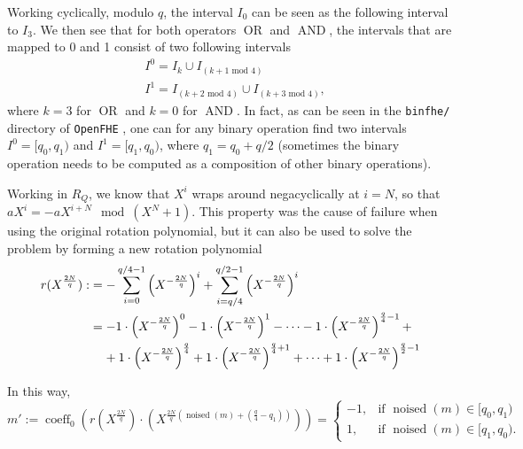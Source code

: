 Working cyclically, modulo $q$, the interval $I_0$ can be seen as the following interval to $I_3$. We then see that for both operators $\operatorname{OR}$ and $\operatorname{AND}$, the intervals that are mapped to 0 and 1 consist of two following intervals
\begin{align*}
&I^0 = I_{k} \cup I_{(k+1 \text{ mod 4})}\\
&I^1 = I_{(k+2 \text{ mod 4})} \cup I_{(k+3 \text{ mod 4})},    
\end{align*}
 where $k=3$ for $\operatorname{OR}$ and $k=0$ for $\operatorname{AND}$. In fact, as can be seen in the \texttt{binfhe/} directory of \texttt{OpenFHE} \cite{cite:openFHE}, one can for any binary operation find two intervals $I^0 = [q_0, q_1)$ and $I^1 = [q_1, q_0)$, where $q_1=q_0 + q/2$ (sometimes the binary operation needs to be computed as a composition of other binary operations).

Working in $R_Q$, we know that $X^i$ wraps around negacyclically at $i=N$, so that $aX^i = -aX^{i+N} \mod (X^N+1)$. This property was the cause of failure when using the original rotation polynomial, but it can also be used to solve the problem by forming a new rotation polynomial
        \begin{align}
            r(X^{\frac{2N}{q}}) :&= -\sum_{i=0}^{q/4-1} \left(X^{-\frac{2N}{q}}\right)^i + \sum_{i=q/4}^{q/2-1} \left(X^{-\frac{2N}{q}}\right)^i \notag \\ %
            &= -1 \cdot \left(X^{-\frac{2N}{q}}\right)^0 - 1 \cdot \left(X^{-\frac{2N}{q}}\right)^1 - \dots - 1 \cdot \left(X^{-\frac{2N}{q}}\right)^{\frac{q}{4}-1} + \notag \\
            & \;\;\;\; + 1 \cdot \left(X^{-\frac{2N}{q}}\right)^{\frac{q}{4}} + 1 \cdot \left(X^{-\frac{2N}{q}}\right)^{\frac{q}{4}+1} + \dots + 1 \cdot \left(X^{-\frac{2N}{q}}\right)^{\frac{q}{2}-1} \notag
        \end{align}

In this way,
\begin{equation*}
    m':=\operatorname{coeff}_0\left(r(X^{\frac{2N}{q}}) \cdot \left(X^{\frac{2N}{q}(\operatorname{noised}(m)+(\frac{q}{4}-q_1))}\right)\right) = 
    \begin{cases}
      -1, & \text{if $\operatorname{noised}(m) \in [q_0, q_1)$} \\
      1, & \text{if $\operatorname{noised}(m) \in [q_1, q_0)$}.
    \end{cases}
\end{equation*}

